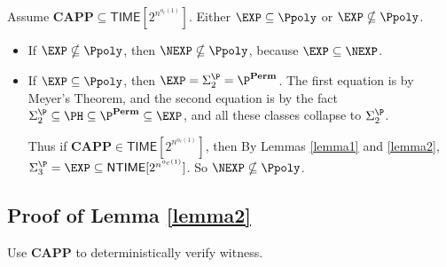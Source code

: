 \documentclass[letterpaper, 12pt]{article}
\newcommand{\Perm}{\mathbf{Perm}}
\newcommand{\CAPP}{\mathbf{CAPP}}
\newcommand{\Time}[1]{\mathsf{TIME}[#1]}
\newcommand{\NTime}[1]{\mathsf{NTIME}[#1]}
\begin{document}
	Assume $\CAPP \subseteq \Time{2^{n^{o_c(1)}}}$. Either $\EXP \subseteq \Ppoly$ or $\EXP \nsubseteq \Ppoly$.
	\begin{itemize}
		\item If $\EXP \nsubseteq \Ppoly$, then $\NEXP \nsubseteq \Ppoly$, because $\EXP \subseteq \NEXP$.
		\item If $\EXP \subseteq \Ppoly$, then $\EXP = \Sigma_2^\P = \P^\Perm$. The first equation is by Meyer's Theorem, and the second equation is by the fact $\Sigma_2^\P \subseteq \PH \subseteq \P^\Perm \subseteq \EXP$, and all these classes collapse to $\Sigma_2^\P$.
		
		Thus if $\CAPP \in \Time{2^{n^{o_c(1)}}}$, then By Lemmas \ref{lemma1} and \ref{lemma2}, $\Sigma_3^\P = \EXP \subseteq \NTime{2^{n^{o_c(1)}}}$. So $\NEXP \nsubseteq \Ppoly$.
	\end{itemize}





\subsection{Proof of Lemma \ref{lemma2}}

Use $\CAPP$ to deterministically verify witness.

\iffalse
\subsection{Proof of Lemma \ref{lemma1}}
We show that If $\Perm \in \Ppoly$, then $\P^\Perm \in \MA \cap \co \MA$.

Given Matrix $M$, Merlin gives a witness $(v,C)$. We want to verify that $\Perm(M) = v$.
$C_n$ is a circuit that supposedly computes $\Perm$.

(1) Get $C_{n-1}, \dots, C_1$, where
\[C_i = C_n\]

(2) Pick a random prime $q$, and check $C_i(\vec{x}) \mod q$.

Compute circuits $D_1, \dots, D_n$, or reject.

If we don't reject, with high probability $D_i = \Perm(M_{i\times i}) \mod q \forall M$.

If $C$ really does compute $\Perm$, we wil never reject..

Say we have $D_i$. We can use expansion by minors to compute $\Perm(M_{(i+1)\times(i+1)})$.

Then, check that $C(M_{(i+1) \times (i+1)}) = \Perm(M_{(i+1) \times (i+1)})$ by plugging in random values.
\fi
\end{document}
